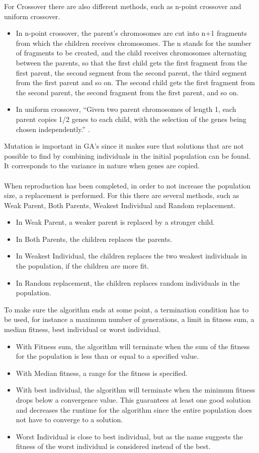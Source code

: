 For Crossover there are also different methods, such as n-point crossover and uniform crossover.
\begin{itemize}
\item In n-point crossover, the parent's chromosomes are cut into n+1 fragments from which the children receives chromosomes. The n stands for the number of fragments to be created, and the child receives chromosomes alternating between the parents, so that the first child gets the first fragment from the first parent, the second segment from the second parent, the third segment from the first parent and so on. The second child gets the first fragment from the second parent, the second fragment from the first parent, and so on.
\item In uniform crossover, ``Given two parent chromosomes of length 1, each parent copies 1/2 genes to each child, with the selection of the genes being chosen independently.'' \cite{GAHandbook1}.
\end{itemize}
Mutation is important in GA's since it makes sure that solutions that are not possible to find by combining individuals in the initial population can be found. It corresponds to the variance in nature when genes are copied.\\\\ %
When reproduction has been completed, in order to not increase the population size, a replacement is performed. For this there are several methods, such as Weak Parent, Both Parents, Weakest Individual and Random replacement.
\begin{itemize}
\item In Weak Parent, a weaker parent is replaced by a stronger child.
\item In Both Parents, the children replaces the parents.
\item In Weakest Individual, the children replaces the two weakest individuals in the population, if the children are more fit.
\item In Random replacement, the children replaces random individuals in the population.
\end{itemize}
To make sure the algorithm ends at some point, a termination condition has to be used, for instance a maximum number of generations, a limit in fitness sum, a median fitness, best individual or worst individual.
\begin{itemize}
\item With Fitness sum, the algorithm will terminate when the sum of the fitness for the population is less than or equal to a specified value.
\item With Median fitness, a range for the fitness is specified.
\item With best individual, the algorithm will terminate when the minimum fitness drops below a convergence value. This guarantees at least one good solution and decreases the runtime for the algorithm since the entire population does not have to converge to a solution.
\item Worst Individual is close to best individual, but as the name suggests the fitness of the worst individual is  considered instead of the best.
\end{itemize}
